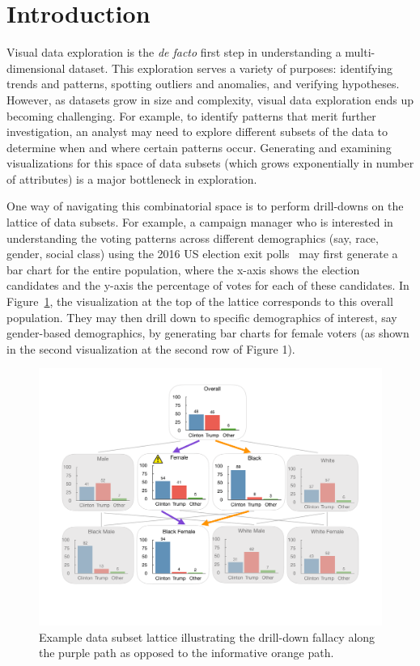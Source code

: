 \section{Introduction}

Visual data exploration is the \emph{de facto} first step in understanding a multi-dimensional dataset. This exploration serves a variety of purposes: identifying trends and patterns, spotting outliers and anomalies, and verifying hypotheses. However, as datasets grow in size and complexity, visual data exploration ends up becoming challenging. For example, to identify patterns that merit further investigation, an analyst may need to explore different subsets of the data to determine when and where certain patterns occur. Generating and examining visualizations for this space of data subsets (which grows exponentially in number of attributes) is a major bottleneck in exploration.

One way of navigating this combinatorial space is to perform drill-downs on the lattice of data subsets. For example, a campaign manager who is interested in understanding the voting patterns across different demographics (say, race, gender, social class) using the 2016 US election exit polls~\cite{exitpolls} may first generate a bar chart for the entire population, where the x-axis shows the election candidates and the y-axis the percentage of votes for each of these candidates. In Figure~\ref{fig:elections_example}, the visualization at the top of the lattice corresponds to this overall population. They may then drill down to specific demographics of interest, say gender-based demographics, by generating bar charts for female voters (as shown in the second visualization at the second row of Figure 1).

\begin{figure}[h!]
\includegraphics[width=\linewidth]{figures/elections_example_lattice_teaser.pdf}
\caption{Example data subset lattice illustrating the drill-down fallacy along the purple path as opposed to the informative orange path.}
\label{fig:elections_example}
\end{figure}

